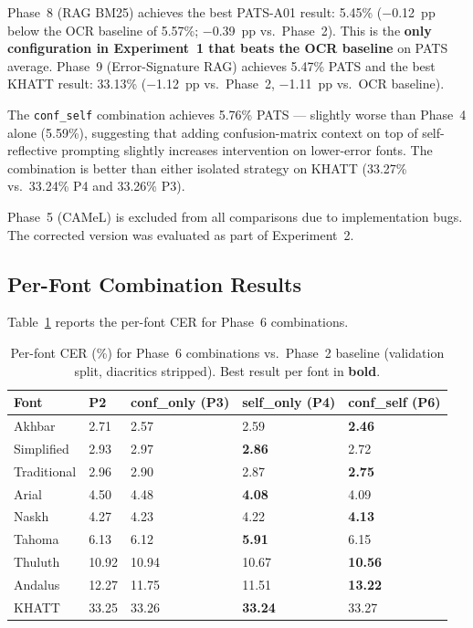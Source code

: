 Phase~8 (RAG BM25) achieves the best PATS-A01 result: 5.45\% ($-$0.12~pp
below the OCR baseline of 5.57\%; $-$0.39~pp vs.\ Phase~2). This is the
\textbf{only configuration in Experiment~1 that beats the OCR baseline} on
PATS average. Phase~9 (Error-Signature RAG) achieves 5.47\% PATS and the
best KHATT result: 33.13\% ($-$1.12~pp vs.\ Phase~2, $-$1.11~pp vs.\
OCR baseline).

The \texttt{conf\_self} combination achieves 5.76\% PATS --- slightly
worse than Phase~4 alone (5.59\%), suggesting that adding confusion-matrix
context on top of self-reflective prompting slightly increases intervention
on lower-error fonts. The combination is better than either isolated
strategy on KHATT (33.27\% vs.\ 33.24\% P4 and 33.26\% P3).

Phase~5 (CAMeL) is excluded from all comparisons due to implementation bugs.
The corrected version was evaluated as part of Experiment~2.

\subsection{Per-Font Combination Results}
\label{subsec:res_p6_per_font}

Table~\ref{tab:p6_per_font} reports the per-font CER for Phase~6 combinations.

\begin{table}[htbp]
  \centering
  \caption{Per-font CER (\%) for Phase~6 combinations vs.\ Phase~2 baseline
           (validation split, diacritics stripped). Best result per font
           in \textbf{bold}.}
  \label{tab:p6_per_font}
  \begin{tabularx}{\textwidth}{lXXXX}
    \toprule
    \textbf{Font} & \textbf{P2} & \textbf{conf\_only (P3)}
      & \textbf{self\_only (P4)} & \textbf{conf\_self (P6)} \\
    \midrule
    Akhbar       &  2.71 &  2.57 &  2.59 &  \textbf{2.46} \\
    Simplified   &  2.93 &  2.97 &  \textbf{2.86} &  2.72 \\
    Traditional  &  2.96 &  2.90 &  2.87 &  \textbf{2.75} \\
    Arial        &  4.50 &  4.48 &  \textbf{4.08} &  4.09 \\
    Naskh        &  4.27 &  4.23 &  4.22 &  \textbf{4.13} \\
    Tahoma       &  6.13 &  6.12 &  \textbf{5.91} &  6.15 \\
    Thuluth      & 10.92 & 10.94 & 10.67 & \textbf{10.56} \\
    Andalus      & 12.27 & 11.75 & 11.51 & \textbf{13.22} \\
    \midrule
    KHATT        & 33.25 & 33.26 & \textbf{33.24} & 33.27 \\
    \bottomrule
  \end{tabularx}
\end{table}

